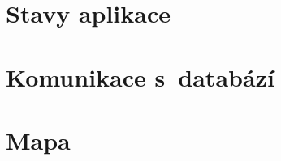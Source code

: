 \hypertarget{stavy-aplikace}{%
\section{Stavy aplikace}\label{stavy-aplikace}}

\hypertarget{komunikace-s-databuxe1zuxed}{%
\section{Komunikace s~databází}\label{komunikace-s-databuxe1zuxed}}

\hypertarget{mapa}{%
\section{Mapa}\label{mapa}}
